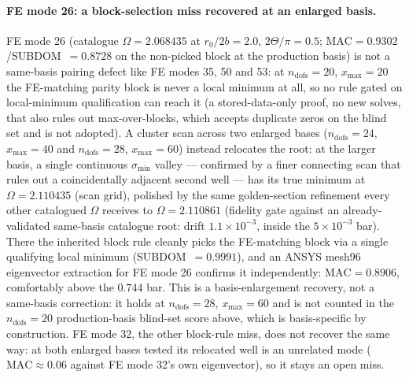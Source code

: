 \documentclass[11pt]{article}
\begin{document}
\paragraph{FE mode 26: a block-selection miss recovered at an enlarged
basis.} FE mode 26 (catalogue $\Omega=2.068435$ at $r_0/2b=2.0$,
$2\Theta/\pi=0.5$; $\mathrm{MAC}=0.9302$/SUBDOM~$=0.8728$ on the
non-picked block at the production basis) is not a same-basis pairing
defect like FE modes 35, 50 and 53: at $n_{\mathrm{dofs}}=20$,
$x_{\max}=20$ the FE-matching parity block is never a local minimum at
all, so no rule gated on local-minimum qualification can reach it (a
stored-data-only proof, no new solves, that also rules out
max-over-blocks, which accepts duplicate zeros on the blind set and is
not adopted). A cluster scan across two enlarged bases
($n_{\mathrm{dofs}}=24$, $x_{\max}=40$ and $n_{\mathrm{dofs}}=28$,
$x_{\max}=60$) instead relocates the root: at the larger basis, a
single continuous $\sigma_{\min}$ valley --- confirmed by a finer
connecting scan that rules out a coincidentally adjacent second well
--- has its true minimum at $\Omega=2.110435$ (scan grid), polished by
the same golden-section refinement every other catalogued $\Omega$
receives to $\Omega=2.110861$ (fidelity gate against an
already-validated same-basis catalogue root: drift $1.1\times10^{-3}$,
inside the $5\times10^{-3}$ bar). There the inherited block rule
cleanly picks the FE-matching block via a single qualifying local
minimum (SUBDOM~$=0.9991$), and an ANSYS mesh96 eigenvector extraction
for FE mode 26 confirms it independently: $\mathrm{MAC}=0.8906$,
comfortably above the $0.744$ bar. This is a basis-enlargement
recovery, not a same-basis correction: it holds at
$n_{\mathrm{dofs}}=28$, $x_{\max}=60$ and is not counted in the
$n_{\mathrm{dofs}}=20$ production-basis blind-set score above, which
is basis-specific by construction. FE mode 32, the other block-rule
miss, does not recover the same way: at both enlarged bases tested its
relocated well is an unrelated mode ($\mathrm{MAC}\approx0.06$
against FE mode 32's own eigenvector), so it stays an open miss.
\end{document}
